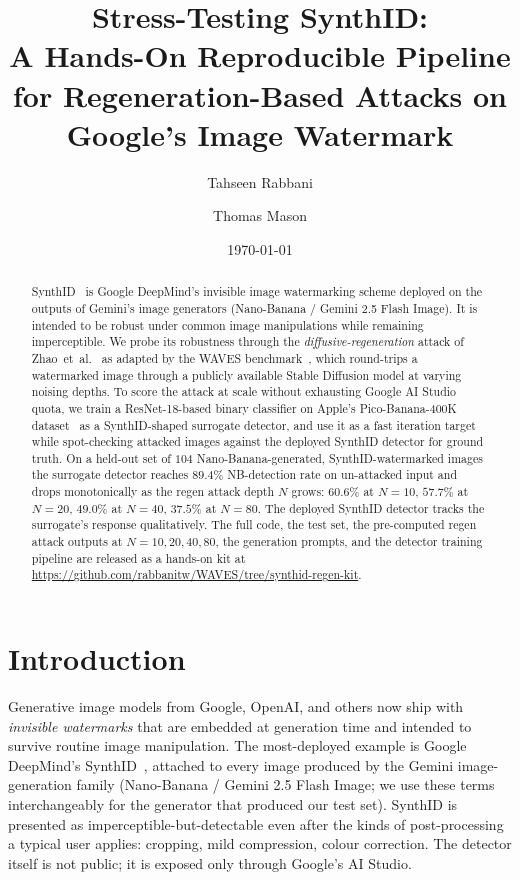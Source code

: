 \documentclass[11pt]{article}
\title{Stress-Testing SynthID:\\[2pt]
\large A Hands-On Reproducible Pipeline for Regeneration-Based Attacks on Google's Image Watermark}
\author[1]{Tahseen Rabbani}
\author[2]{Thomas Mason}
\affil[1]{Department of Computer Science, University of Chicago}
\affil[2]{Coalfire Systems}
\date{\today}
\begin{document}
\maketitle

\begin{abstract}
SynthID~\citep{synthid2023} is Google DeepMind's invisible image watermarking
scheme deployed on the outputs of Gemini's image generators
(Nano-Banana / Gemini 2.5 Flash Image). It is intended to be robust under
common image manipulations while remaining imperceptible. We probe its
robustness through the \emph{diffusive-regeneration} attack of
Zhao~et~al.~\citep{zhao2023provable} as adapted by the WAVES
benchmark~\citep{an2024waves}, which round-trips a watermarked image
through a publicly available Stable Diffusion model at varying noising
depths. To score the attack at scale without exhausting Google AI Studio
quota, we train a ResNet-18-based binary classifier on Apple's
Pico-Banana-400K dataset~\citep{pico-banana-400k} as a SynthID-shaped
surrogate detector, and use it as a fast iteration target while
spot-checking attacked images against the deployed SynthID detector for
ground truth. On a held-out set of $104$ Nano-Banana-generated,
SynthID-watermarked images the surrogate detector reaches $89.4\%$
NB-detection rate on un-attacked input and drops monotonically as the
regen attack depth $N$ grows: $60.6\%$ at $N{=}10$, $57.7\%$ at $N{=}20$,
$49.0\%$ at $N{=}40$, $37.5\%$ at $N{=}80$. The deployed SynthID detector
tracks the surrogate's response qualitatively. The full code, the test
set, the pre-computed regen attack outputs at $N{=}10,20,40,80$, the
generation prompts, and the detector training pipeline are released as
a hands-on kit at
\url{https://github.com/rabbanitw/WAVES/tree/synthid-regen-kit}.
\end{abstract}

\section{Introduction}
\label{sec:intro}

Generative image models from Google, OpenAI, and others now ship with
\emph{invisible watermarks} that are embedded at generation time and
intended to survive routine image manipulation. The most-deployed example
is Google DeepMind's SynthID~\citep{synthid2023}, attached to every image
produced by the Gemini image-generation family (Nano-Banana / Gemini
2.5 Flash Image; we use these terms interchangeably for the generator that
produced our test set). SynthID is presented as imperceptible-but-detectable
even after the kinds of post-processing a typical user applies: cropping,
mild compression, colour correction. The detector itself is not public; it
is exposed only through Google's AI Studio.
\end{document}
